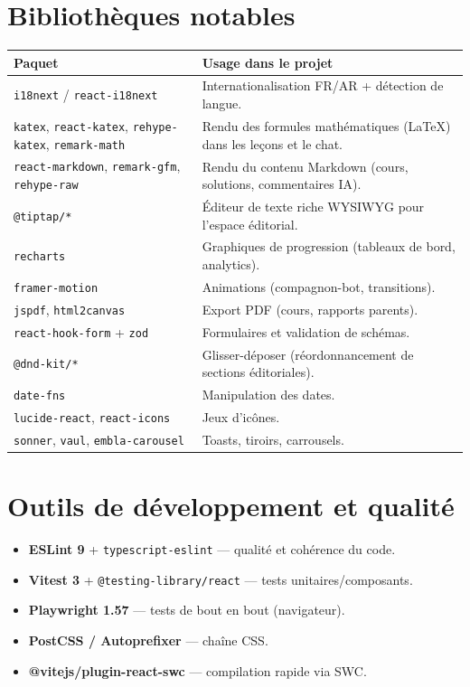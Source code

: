 \section{Bibliothèques notables}
\begin{longtable}{p{4.5cm}p{10cm}}
\toprule
\textbf{Paquet} & \textbf{Usage dans le projet} \\
\midrule
\endhead
\texttt{i18next} / \texttt{react-i18next} & Internationalisation FR/AR + détection de langue. \\
\texttt{katex}, \texttt{react-katex}, \texttt{rehype-katex}, \texttt{remark-math} & Rendu des formules mathématiques (\LaTeX) dans les leçons et le chat. \\
\texttt{react-markdown}, \texttt{remark-gfm}, \texttt{rehype-raw} & Rendu du contenu Markdown (cours, solutions, commentaires IA). \\
\texttt{@tiptap/*} & Éditeur de texte riche WYSIWYG pour l'espace éditorial. \\
\texttt{recharts} & Graphiques de progression (tableaux de bord, analytics). \\
\texttt{framer-motion} & Animations (compagnon-bot, transitions). \\
\texttt{jspdf}, \texttt{html2canvas} & Export PDF (cours, rapports parents). \\
\texttt{react-hook-form} + \texttt{zod} & Formulaires et validation de schémas. \\
\texttt{@dnd-kit/*} & Glisser-déposer (réordonnancement de sections éditoriales). \\
\texttt{date-fns} & Manipulation des dates. \\
\texttt{lucide-react}, \texttt{react-icons} & Jeux d'icônes. \\
\texttt{sonner}, \texttt{vaul}, \texttt{embla-carousel} & Toasts, tiroirs, carrousels. \\
\bottomrule
\end{longtable}

\section{Outils de développement et qualité}
\begin{itemize}
  \item \textbf{ESLint 9} + \texttt{typescript-eslint} --- qualité et cohérence du code.
  \item \textbf{Vitest 3} + \texttt{@testing-library/react} --- tests unitaires/composants.
  \item \textbf{Playwright 1.57} --- tests de bout en bout (navigateur).
  \item \textbf{PostCSS / Autoprefixer} --- chaîne CSS.
  \item \textbf{@vitejs/plugin-react-swc} --- compilation rapide via SWC.
\end{itemize}

